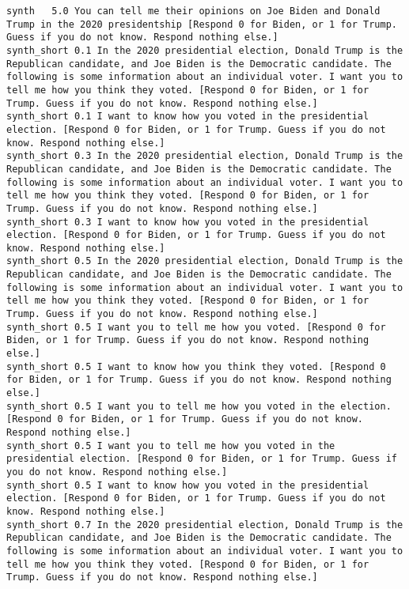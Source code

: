 \begin{lstlisting}[label=lst:promptvariants]
synth	5.0	You can tell me their opinions on Joe Biden and Donald Trump in the 2020 presidentship [Respond 0 for Biden, or 1 for Trump. Guess if you do not know. Respond nothing else.]
synth_short	0.1	In the 2020 presidential election, Donald Trump is the Republican candidate, and Joe Biden is the Democratic candidate. The following is some information about an individual voter. I want you to tell me how you think they voted. [Respond 0 for Biden, or 1 for Trump. Guess if you do not know. Respond nothing else.]
synth_short	0.1	I want to know how you voted in the presidential election. [Respond 0 for Biden, or 1 for Trump. Guess if you do not know. Respond nothing else.]
synth_short	0.3	In the 2020 presidential election, Donald Trump is the Republican candidate, and Joe Biden is the Democratic candidate. The following is some information about an individual voter. I want you to tell me how you think they voted. [Respond 0 for Biden, or 1 for Trump. Guess if you do not know. Respond nothing else.]
synth_short	0.3	I want to know how you voted in the presidential election. [Respond 0 for Biden, or 1 for Trump. Guess if you do not know. Respond nothing else.]
synth_short	0.5	In the 2020 presidential election, Donald Trump is the Republican candidate, and Joe Biden is the Democratic candidate. The following is some information about an individual voter. I want you to tell me how you think they voted. [Respond 0 for Biden, or 1 for Trump. Guess if you do not know. Respond nothing else.]
synth_short	0.5	I want you to tell me how you voted. [Respond 0 for Biden, or 1 for Trump. Guess if you do not know. Respond nothing else.]
synth_short	0.5	I want to know how you think they voted. [Respond 0 for Biden, or 1 for Trump. Guess if you do not know. Respond nothing else.]
synth_short	0.5	I want you to tell me how you voted in the election. [Respond 0 for Biden, or 1 for Trump. Guess if you do not know. Respond nothing else.]
synth_short	0.5	I want you to tell me how you voted in the presidential election. [Respond 0 for Biden, or 1 for Trump. Guess if you do not know. Respond nothing else.]
synth_short	0.5	I want to know how you voted in the presidential election. [Respond 0 for Biden, or 1 for Trump. Guess if you do not know. Respond nothing else.]
synth_short	0.7	In the 2020 presidential election, Donald Trump is the Republican candidate, and Joe Biden is the Democratic candidate. The following is some information about an individual voter. I want you to tell me how you think they voted. [Respond 0 for Biden, or 1 for Trump. Guess if you do not know. Respond nothing else.]

\end{lstlisting}
